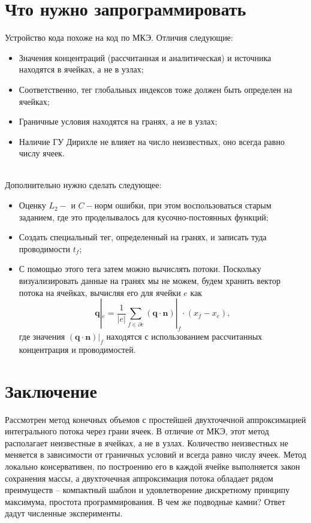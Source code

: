\documentclass[a4paper, 11pt]{article}
\begin{document}
\section{Что нужно запрограммировать}

Устройство кода похоже на код по МКЭ. Отличия следующие:

\begin{itemize}
	\item Значения концентраций (рассчитанная и аналитическая) и источника находятся в ячейках, а не в узлах;
	\item Соответственно, тег глобальных индексов тоже должен быть определен на ячейках;
	\item Граничные условия находятся на гранях, а не в узлах;
	\item Наличие ГУ Дирихле не влияет на число неизвестных, оно всегда равно числу ячеек.
\end{itemize}
~\\
Дополнительно нужно сделать следующее:

\begin{itemize}
	\item Оценку $L_2-$ и $C-$норм ошибки, при этом воспользоваться старым заданием, где это проделывалось для кусочно-постоянных функций;
	\item Создать специальный тег, определенный на гранях, и записать туда проводимости $t_f$;
	\item С помощью этого тега затем можно вычислять потоки. Поскольку визуализировать данные на гранях мы не можем, будем хранить вектор потока на ячейках, вычисляя его для ячейки $e$ как
	\begin{equation*}
	\mathbf{q}|_e = \frac{1}{|e|}\sum_{f \in \partial e}\left(\mathbf{q}\cdot\mathbf{n}\right)|_f \cdot (x_f - x_e),
	\end{equation*}
	где значения $\left(\mathbf{q}\cdot\mathbf{n}\right)|_f $ находятся с использованием рассчитанных концентрация и проводимостей.
\end{itemize}

\section{Заключение}

Рассмотрен метод конечных объемов с простейшей двухточечной аппроксимацией интегрального потока через грани ячеек. В отличие от МКЭ, этот метод располагает неизвестные в ячейках, а не в узлах. Количество неизвестных не меняется в зависимости от граничных условий и всегда равно числу ячеек. Метод локально консервативен, по построению его в каждой ячейке выполняется закон сохранения массы, а двухточечная аппроксимация потока обладает рядом преимуществ -- компактный шаблон и удовлетворение дискретному принципу максимума, простота программирования. В чем же подводные камни? Ответ дадут численные эксперименты.
\end{document}
